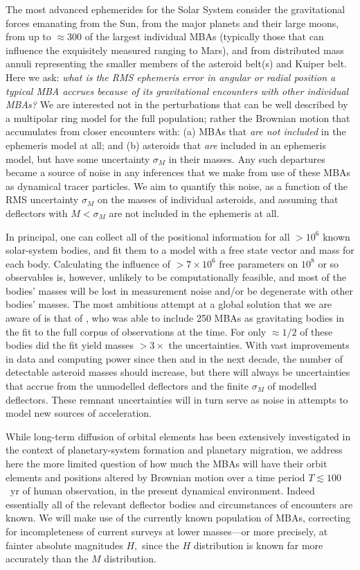 \documentclass[linenumbers, onecolumn]{aastex631}
\begin{document}
The most advanced ephemerides for the Solar System \citep{de440,inpop,pitjeva} consider the
gravitational forces emanating from the Sun, from the major planets and their large
moons, from up to $\approx300$ of the largest individual MBAs (typically those that can influence the exquisitely measured ranging to Mars), and
from distributed mass annuli representing the smaller members of
 the asteroid belt(s) and Kuiper belt.
Here we ask: \textit{what is the RMS ephemeris error in angular or radial
position a typical MBA accrues because of its gravitational
encounters with other individual MBAs?}  We are interested not in the
perturbations that can be well described by a multipolar ring model
for the full population; rather the Brownian motion that accumulates
from closer encounters with: (a) MBAs that \emph{are not included} in the
ephemeris model at all; and (b) asteroids that \emph{are} included
in an ephemeris model, but have some uncertainty $\sigma_M$ in their masses.
Any such departures became a source of noise in any
inferences that we make from use of these MBAs as
dynamical tracer particles.  We aim to quantify this noise, as a
function of the RMS uncertainty $\sigma_M$ on the masses of individual
asteroids, and assuming that deflectors with $M<\sigma_M$ are not
included in the ephemeris at all.

In principal, one can collect all of the positional information for
all $>10^6$ known solar-system bodies, and fit them to a model with
a free state vector and mass for each body.  Calculating the influence
of $>7\times10^6$ free parameters on $10^8$ or so observables is,
however, unlikely to be computationally feasible, and most of the
bodies' masses will be lost in measurement noise and/or be degenerate
with other bodies' masses.  The most ambitious attempt at a global
solution that we are aware of is that of \citet{goffin}, who was able
to include 250 MBAs as gravitating bodies in the fit to the full
corpus of observations at the time.  For only $\approx 1/2$ of these
bodies did the fit yield masses $>3\times$ the uncertainties.  With
vast improvements in data and computing power since then and in the
next decade, the number of detectable
asteroid masses should increase, but there will always be
uncertainties that accrue from the unmodelled deflectors and the
finite $\sigma_M$ of modelled deflectors.  These remnant uncertainties
will in turn serve as noise in attempts to model new sources of
acceleration.

While long-term diffusion of orbital elements has been extensively
investigated in the context of planetary-system formation and
planetary migration, we address here the more limited question of how
much the MBAs will have their orbit elements and positions altered
by Brownian motion over a time period $T \lesssim100$~yr of human
observation, in the present dynamical environment.  Indeed essentially
all of the relevant deflector bodies and circumstances of encounters
are known.  We will make use
of the currently known population of MBAs, correcting for
incompleteness of current surveys at lower masses---or more precisely,
at fainter absolute magnitudes $H,$ since the $H$ distribution is
known far more accurately than the $M$ distribution.
\end{document}
